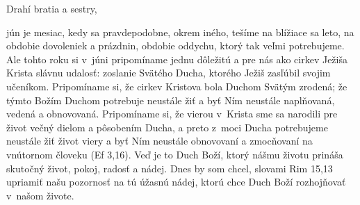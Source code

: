 







Drahí bratia a sestry,

jún je mesiac, kedy sa pravdepodobne, okrem iného, tešíme na blížiace sa leto, na obdobie dovoleniek a prázdnin, obdobie oddychu, ktorý tak veľmi potrebujeme. Ale tohto roku si v~júni pripomíname jednu dôležitú a pre nás ako cirkev Ježiša Krista slávnu udalosť: zoslanie Svätého Ducha, ktorého Ježiš zasľúbil svojim učeníkom. Pripomíname si, že cirkev Kristova bola Duchom Svätým zrodená; že týmto Božím Duchom potrebuje neustále žiť a byť Ním neustále naplňovaná, vedená a obnovovaná. Pripomíname si, že vierou v~Krista sme sa narodili pre život večný dielom a pôsobením Ducha, a preto z~moci Ducha potrebujeme neustále žiť život viery a byť Ním neustále obnovovaní a zmocňovaní na vnútornom človeku (Ef 3,16). Veď je to Duch Boží, ktorý nášmu životu prináša skutočný život, pokoj, radosť a nádej. Dnes by som chcel, slovami Rim 15,13 upriamiť našu pozornosť na tú úžasnú nádej, ktorú chce Duch Boží rozhojňovať v~našom živote.

